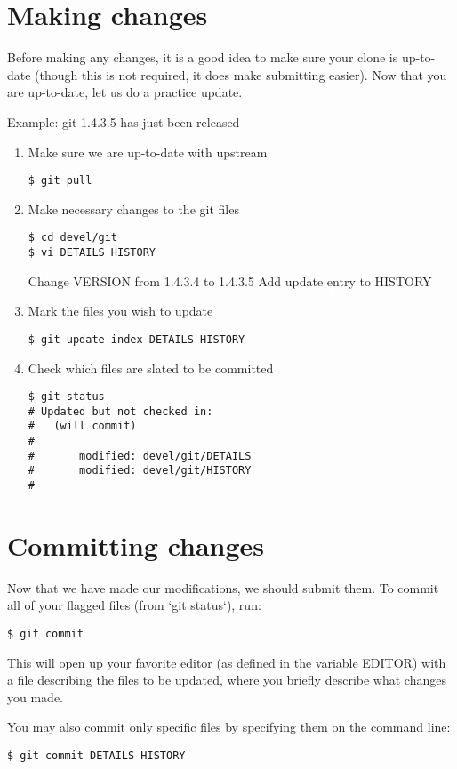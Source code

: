 \documentclass[a4paper,10pt]{book}
\begin{document}
\section{Making changes}
Before making any changes, it is a good idea to make sure your clone is
up-to-date (though this is not required, it does make submitting easier).
Now that you are up-to-date, let us do a practice update.

Example: git 1.4.3.5 has just been released
\begin{enumerate}
\item Make sure we are up-to-date with upstream
\begin{verbatim}
$ git pull
\end{verbatim}
\item Make necessary changes to the git files
\begin{verbatim}
$ cd devel/git
$ vi DETAILS HISTORY
\end{verbatim}
Change VERSION from 1.4.3.4 to 1.4.3.5
Add update entry to HISTORY
\item Mark the files you wish to update
\begin{verbatim}
$ git update-index DETAILS HISTORY
\end{verbatim}
\item Check which files are slated to be committed
\begin{verbatim}
$ git status
# Updated but not checked in:
#   (will commit)
#
#       modified: devel/git/DETAILS
#       modified: devel/git/HISTORY
#
\end{verbatim}
\end{enumerate}

\section{Committing changes}
Now that we have made our modifications, we should submit them. To commit
all of your flagged files (from `git status`), run:
\begin{verbatim}
$ git commit
\end{verbatim}

This will open up your favorite editor (as defined in the variable EDITOR)
with a file describing the files to be updated, where you briefly describe
what changes you made.

You may also commit only specific files by specifying them on the command
line:
\begin{verbatim}
$ git commit DETAILS HISTORY
\end{verbatim}
\end{document}
